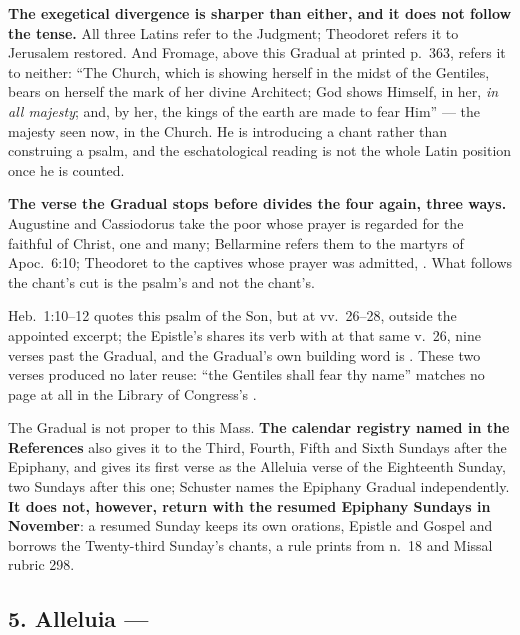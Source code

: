 \textbf{The exegetical divergence is sharper than either, and it does not follow
the tense.} All three Latins refer  to the Judgment; Theodoret
refers it to Jerusalem restored. And Fromage, above this Gradual at printed
p.~363, refers it to neither: ``The Church, which is showing herself in the midst
of the Gentiles, bears on herself the mark of her divine Architect; God shows
Himself, in her, \emph{in all majesty}; and, by her, the kings of the earth are
made to fear Him'' --- the majesty seen now, in the Church. He is introducing a
chant rather than construing a psalm, and the eschatological reading is not the
whole Latin position once he is counted.

\textbf{The verse the Gradual stops before divides the four again, three ways.}
Augustine and Cassiodorus take the poor whose prayer is regarded for the
faithful of Christ, one and many; Bellarmine refers them to the martyrs of
Apoc.~6:10; Theodoret to the captives whose prayer was admitted, . What follows the chant's cut is the
psalm's and not the chant's.

Heb.~1:10--12 quotes this psalm of the Son, but at vv.~26--28, outside the
appointed excerpt; the Epistle's  shares its verb
with  at that same v.~26, nine verses past the Gradual, and the
Gradual's own building word is . These two verses produced no
later reuse: ``the Gentiles shall fear thy name'' matches no page at all in the
Library of Congress's .

The Gradual is not proper to this Mass. \textbf{The calendar registry named in the
References} also gives it to the Third, Fourth, Fifth and Sixth Sundays after the Epiphany, and gives its
first verse as the Alleluia verse of the Eighteenth Sunday, two Sundays after
this one; Schuster names the Epiphany Gradual independently. \textbf{It does not,
however, return with the resumed Epiphany Sundays in November}: a resumed Sunday
keeps its own orations, Epistle and Gospel and borrows the Twenty-third Sunday's
chants, a rule 
prints from  n.~18 and Missal rubric 298.

\subsection*{5. Alleluia  --- }

